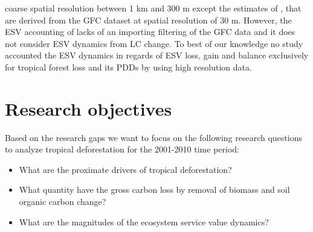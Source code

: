 coarse spatial resolution between 1 km and 300 m except the estimates of \citet{Song2018}, that are derived from the \ac{GFC} dataset at spatial resolution of 30 m. However, the \ac{ESV} accounting of \citet{Song2018} lacks of an importing filtering of the \ac{GFC} data and it does not consider \ac{ESV} dynamics from \ac{LC} change. To best of our knowledge no study accounted the \ac{ESV} dynamics in regards of \ac{ESV} loss, gain and balance exclusively for tropical forest loss and its \acp{PDD} by using high resolution data.

	\section{Research objectives}
		Based on the research gaps we want to focus on the following research questions to analyze tropical deforestation for the 2001-2010 time period:
		\begin{itemize}
			\item What are the proximate drivers of tropical deforestation?
			\item What quantity have the gross carbon loss by removal of biomass and soil organic carbon change?
			\item What are the magnitudes of the ecosystem service value dynamics?
		\end{itemize}